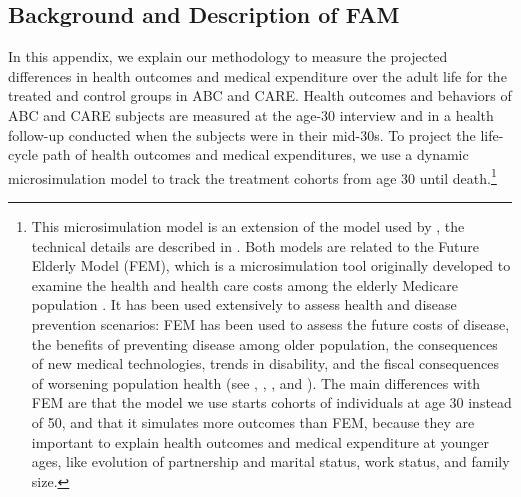 \subsection{Background and Description of FAM}

\noindent In this appendix, we explain our methodology to measure the projected differences in health outcomes and medical expenditure over the adult life for the treated and control groups in ABC and CARE.
Health outcomes and behaviors of ABC and CARE subjects are measured at the age-30 interview and in a health follow-up conducted when the subjects were in their mid-30s.
To project the life-cycle path of health outcomes and medical expenditures, we use a dynamic microsimulation model to track the treatment cohorts from age 30 until death.\footnote{This microsimulation model is an extension of the model used by \citet{Prados_etal_2015_How-Much-Can-Education}, the technical details are described in \citet{Goldman_etal_2015_Future-America-Model}. Both models are related to the Future Elderly Model (FEM), which is a microsimulation tool originally developed to examine the health and health care costs among the elderly Medicare population \citep{Goldman_etal_2004_RAND-Report_Health-Status-Elderly}. It has been used extensively to assess health and disease prevention scenarios: FEM has been used to assess the future costs of disease, the benefits of preventing disease among older population, the consequences of new medical technologies, trends in disability, and the fiscal consequences of worsening population health (see \citet{Goldman_etal_2004_RAND-Report_Health-Status-Elderly}, \citet{Lakdawalla_etal_2004_Health-and-Cost}, \citet{Goldman_etal_2005_HA}, and \citet{Zissimopoulos_etal_2014_Delaying-Alzheimers}). The main differences with FEM are that the model we use starts cohorts of individuals at age 30 instead of 50, and that it simulates more outcomes than FEM, because they are important to explain health outcomes and medical expenditure at younger ages, like evolution of partnership and marital status, work status, and family size.} \\

